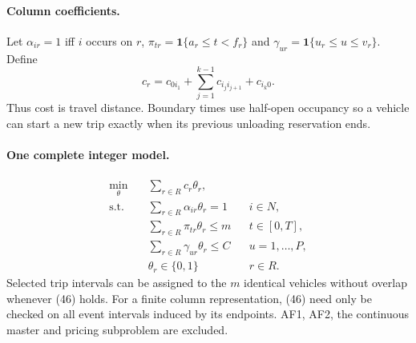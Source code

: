 \documentclass[11pt]{article}
\begin{document}
\paragraph{Column coefficients.}
Let $\alpha_{ir}=1$ iff $i$ occurs on $r$,
$\pi_{tr}=\mathbf1\{a_r\le t<f_r\}$ and
$\gamma_{ur}=\mathbf1\{u_r\le u\le v_r\}$.
Define
\[
 c_r=c_{0i_1}+\sum_{j=1}^{k-1}c_{i_ji_{j+1}}+c_{i_k0}.
\]
Thus cost is travel distance. Boundary times use
half-open occupancy so a vehicle can start a new trip exactly when its
previous unloading reservation ends.
\paragraph{One complete integer model.}
\begin{align}
\min_{\theta}\quad &\sum_{r\in R}c_r\theta_r,\tag{44}\\
\text{s.t.}\quad &\sum_{r\in R}\alpha_{ir}\theta_r=1 &&i\in N,\tag{45}\\
&\sum_{r\in R}\pi_{tr}\theta_r\le m &&t\in[0,T],\tag{46}\\
&\sum_{r\in R}\gamma_{ur}\theta_r\le C &&u=1,\ldots,P,\tag{47}\\
&\theta_r\in\{0,1\} &&r\in R.\tag{48}
\end{align}
Selected trip intervals can be assigned to the $m$ identical vehicles
without overlap whenever (46) holds. For a finite column representation,
(46) need only be checked on all event intervals induced by its endpoints.
AF1, AF2, the continuous master and pricing subproblem are excluded.
\end{document}
